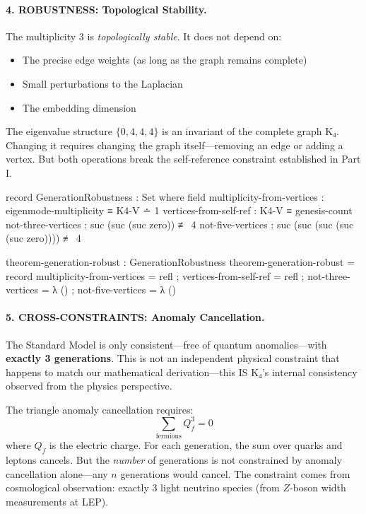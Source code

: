 \documentclass[11pt,a4paper]{book}
\begin{document}
\paragraph{4. ROBUSTNESS: Topological Stability.}

The multiplicity 3 is \emph{topologically stable}. It does not depend on:
\begin{itemize}
\item The precise edge weights (as long as the graph remains complete)
\item Small perturbations to the Laplacian
\item The embedding dimension
\end{itemize}

The eigenvalue structure $\{0, 4, 4, 4\}$ is an invariant of the complete graph K₄. Changing it requires changing the graph itself—removing an edge or adding a vertex. But both operations break the self-reference constraint established in Part I.

\begin{code}
record GenerationRobustness : Set where
  field
    multiplicity-from-vertices : eigenmode-multiplicity ≡ K4-V ∸ 1
    vertices-from-self-ref     : K4-V ≡ genesis-count
    not-three-vertices         : suc (suc (suc zero)) ≢ 4
    not-five-vertices          : suc (suc (suc (suc (suc zero)))) ≢ 4

theorem-generation-robust : GenerationRobustness
theorem-generation-robust = record
  { multiplicity-from-vertices = refl
  ; vertices-from-self-ref     = refl
  ; not-three-vertices         = λ ()
  ; not-five-vertices          = λ ()
  }
\end{code}

\paragraph{5. CROSS-CONSTRAINTS: Anomaly Cancellation.}

The Standard Model is only consistent—free of quantum anomalies—with \textbf{exactly 3 generations}. This is not an independent physical constraint that happens to match our mathematical derivation—this IS K₄'s internal consistency observed from the physics perspective.

The triangle anomaly cancellation requires:
\[
\sum_{\text{fermions}} Q_f^3 = 0
\]
where $Q_f$ is the electric charge. For each generation, the sum over quarks and leptons cancels. But the \emph{number} of generations is not constrained by anomaly cancellation alone—any $n$ generations would cancel. The constraint comes from cosmological observation: exactly 3 light neutrino species (from $Z$-boson width measurements at LEP).
\end{document}
